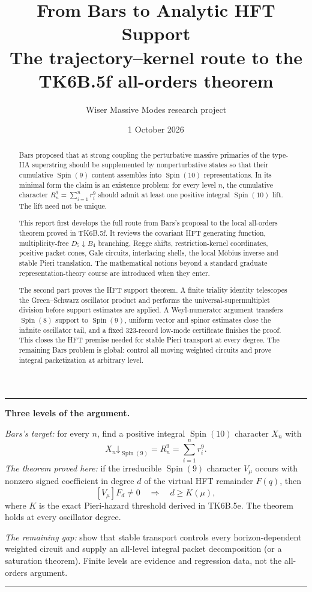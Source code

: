 \documentclass[11pt,a4paper]{article}
\title{\textbf{From Bars to Analytic HFT Support}\\
\large The trajectory--kernel route to the TK6B.5f all-orders theorem}
\author{Wiser Massive Modes research project}
\date{1 October 2026}
\theoremstyle{definition}
\newcommand{\Spin}{\operatorname{Spin}}
\newenvironment{summarybox}
  {\begin{center}\begin{minipage}{0.92\textwidth}\color{darkgray}
   \hrule\vspace{0.7em}}
  {\vspace{0.5em}\hrule\end{minipage}\end{center}}
\begin{document}
\maketitle

\begin{abstract}
Bars proposed that at strong coupling the perturbative massive primaries of
the type-IIA superstring should be supplemented by nonperturbative states so
that their cumulative $\Spin(9)$ content assembles into $\Spin(10)$
representations.  In its minimal form the claim is an existence problem: for
every level $n$, the cumulative character
$R_n^9=\sum_{i=1}^{n}r_i^9$ should admit at least one positive integral
$\Spin(10)$ lift.  The lift need not be unique.

This report first develops the full route from Bars's proposal to the local
all-orders theorem proved in TK6B.5f.  It reviews the covariant HFT generating
function, multiplicity-free $D_5\downarrow B_4$ branching, Regge shifts,
restriction-kernel coordinates, positive packet cones, Gale circuits,
interlacing shells, the local M\"obius inverse and stable Pieri translation.
The mathematical notions beyond a standard graduate representation-theory
course are introduced when they enter.

The second part proves the HFT support theorem.  A finite triality identity
telescopes the Green--Schwarz oscillator product and performs the
universal-supermultiplet division before support estimates are applied.  A
Weyl-numerator argument transfers $\Spin(8)$ support to $\Spin(9)$, uniform
vector and spinor estimates close the infinite oscillator tail, and a fixed
323-record low-mode certificate finishes the proof.  This closes the HFT
premise needed for stable Pieri transport at every degree.  The remaining
Bars problem is global: control all moving weighted circuits and prove
integral packetization at arbitrary level.
\end{abstract}

\begin{summarybox}
\textbf{Three levels of the argument.}

\emph{Bars's target:} for every $n$, find a positive integral $\Spin(10)$
character $X_n$ with
\[
   X_n\mathord\downarrow_{\Spin(9)}=R_n^9
   =\sum_{i=1}^{n}r_i^9.
\]
\emph{The theorem proved here:} if the irreducible $\Spin(9)$ character
$V_\mu$ occurs with nonzero signed coefficient in degree $d$ of the virtual
HFT remainder $F(q)$, then
\[
   [V_\mu]F_d\neq0 \quad\Longrightarrow\quad d\geq K(\mu),
\]
where $K$ is the exact Pieri-hazard threshold derived in TK6B.5e.  The theorem
holds at every oscillator degree.

\emph{The remaining gap:} show that stable transport controls every
horizon-dependent weighted circuit and supply an all-level integral packet
decomposition (or a saturation theorem).  Finite levels are evidence and
regression data, not the all-orders argument.
\end{summarybox}
\end{document}
